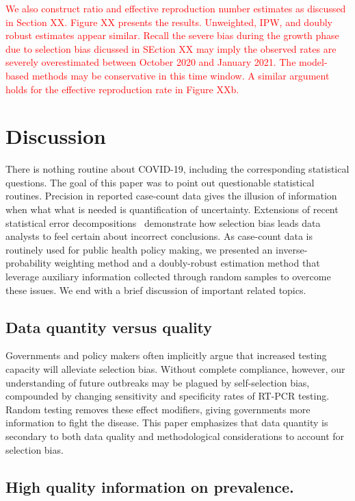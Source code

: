 \documentclass[11pt]{amsart}
\numberwithin{equation}{section}
\theoremstyle{plain}
\begin{document}
\textcolor{red}{
We also construct ratio and effective reproduction number estimates as discussed in Section XX. Figure XX presents the results.  Unweighted, IPW, and doubly robust estimates appear similar.  Recall the severe bias during the growth phase due to selection bias dicussed in SEction XX may imply the observed rates are severely overestimated between October 2020 and January 2021.  The model-based methods may be conservative in this time window.  A similar argument holds for the effective reproduction rate in Figure XXb.
}

\section{Discussion}
\label{section:discussion}

There is nothing routine about COVID-19, including the corresponding statistical questions.  The goal of this paper was to point out questionable statistical routines.  Precision in reported case-count data gives the illusion of information when what what is needed is quantification of uncertainty. Extensions of recent statistical error decompositions~\cite{Meng2018} demonstrate how selection bias leads data analysts to feel certain about incorrect conclusions.  As case-count data is routinely used for public health policy making, we presented an inverse-probability weighting method and a doubly-robust estimation method that leverage auxiliary information collected through random samples to overcome these issues. We end with a brief discussion of important related topics.

\subsection*{Data quantity versus quality}

Governments and policy makers often implicitly argue that increased testing capacity will alleviate selection bias.  Without complete compliance, however, our understanding of future outbreaks may be plagued by self-selection bias, compounded by changing sensitivity and specificity rates of RT-PCR testing. Random testing removes these effect modifiers, giving governments more information to fight the disease.  This paper emphasizes that data quantity is secondary to both data quality and methodological considerations to account for selection bias.

\subsection*{High quality information on prevalence.}
\end{document}
